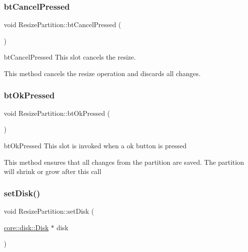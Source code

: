 \subsubsection{\texorpdfstring{bt\+Cancel\+Pressed}{btCancelPressed}}
{\footnotesize\ttfamily void Resize\+Partition\+::bt\+Cancel\+Pressed (\begin{DoxyParamCaption}{ }\end{DoxyParamCaption})\hspace{0.3cm}{\ttfamily [slot]}}



bt\+Cancel\+Pressed This slot cancels the resize. 

This method cancels the resize operation and discards all changes. \mbox{\label{classui_1_1window_1_1_resize_partition_ab742e4bcdf7e0684ad3e8a787309ef5d}} 
\subsubsection{\texorpdfstring{bt\+Ok\+Pressed}{btOkPressed}}
{\footnotesize\ttfamily void Resize\+Partition\+::bt\+Ok\+Pressed (\begin{DoxyParamCaption}{ }\end{DoxyParamCaption})\hspace{0.3cm}{\ttfamily [slot]}}



bt\+Ok\+Pressed This slot is invoked when a ok button is pressed 

This method ensures that all changes from the partition are saved. The partition will shrink or grow after this call \mbox{\label{classui_1_1window_1_1_resize_partition_a1c14acdca1d021b12584b639ac51fc7c}} 
\subsubsection{\texorpdfstring{set\+Disk()}{setDisk()}}
{\footnotesize\ttfamily void Resize\+Partition\+::set\+Disk (\begin{DoxyParamCaption}\item[{\mbox{\hyperlink{classcore_1_1disk_1_1_disk}{core\+::disk\+::\+Disk}} $\ast$}]{disk }\end{DoxyParamCaption})}



